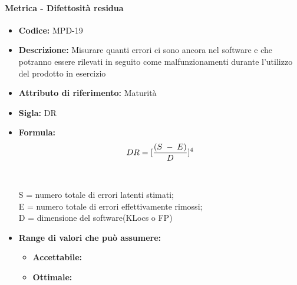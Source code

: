                   \paragraph{Metrica - Difettosità residua} 
            \begin{itemize}
           \item   \textbf{Codice:} MPD-19
           \item   \textbf{Descrizione:} Misurare quanti errori ci sono ancora nel software e che potranno essere rilevati in seguito come malfunzionamenti durante l'utilizzo del prodotto in esercizio 
           \item   \textbf{Attributo di riferimento:} Maturità
           \item   \textbf{Sigla:} DR
           \item   \textbf{Formula:} $$DR = {[{(S\; - \; E)\over D}]^4}$$\\ \\
            S = numero totale di errori latenti stimati;\\
            E = numero totale di errori effettivamente rimossi;\\
            D = dimensione del software(KLocs o FP)
            \item \textbf{Range di valori che può assumere:}
        \begin{itemize}
            \item \textbf{Accettabile:} 
            \item \textbf{Ottimale:} 
        \end{itemize}
       \end{itemize}
       

